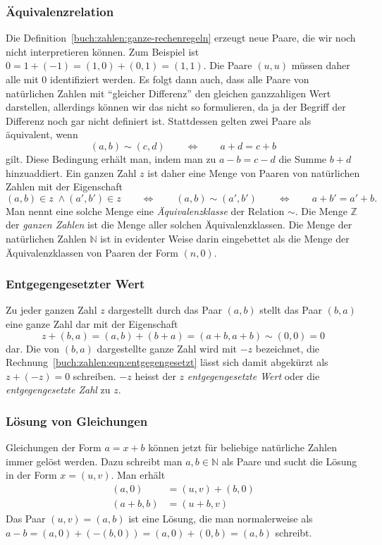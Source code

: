 \subsubsection{Äquivalenzrelation}
Die Definition~\eqref{buch:zahlen:ganze-rechenregeln}
erzeugt neue Paare, die wir noch nicht interpretieren können.
Zum Beispiel ist $0=1+(-1) = (1,0) + (0,1) = (1,1)$.
Die Paare $(u,u)$ müssen daher alle mit $0$ identifiziert werden.
Es folgt dann auch, dass alle Paare von natürlichen Zahlen mit 
``gleicher Differenz'' den gleichen ganzzahligen Wert darstellen,
allerdings können wir das nicht so formulieren, da ja der Begriff
der Differenz noch gar nicht definiert ist.
Stattdessen gelten zwei Paare als äquivalent, wenn
\begin{equation}
(a,b) \sim (c,d)
\qquad\Leftrightarrow\qquad
a+d = c+b
\label{buch:zahlen:ganz-aquivalenz}
\end{equation}
gilt.
Diese Bedingung erhält man, indem man zu $a-b=c-d$ die Summe $b+d$ 
hinzuaddiert.
Ein ganzen Zahl $z$ ist daher eine Menge von Paaren von natürlichen
Zahlen mit der Eigenschaft
\[
(a,b)\in z\;\wedge (a',b')\in z
\qquad\Leftrightarrow\qquad
(a,b)\sim(a',b')
\qquad\Leftrightarrow\qquad
a+b' = a'+b.
\]
Man nennt eine solche Menge eine {\em Äquivalenzklasse} der Relation $\sim$.
Die Menge $\mathbb{Z}$ der {\em ganzen Zahlen} ist die Menge aller solchen
%
Äquivalenzklassen.
Die Menge der natürlichen Zahlen $\mathbb{N}$ ist in evidenter Weise
darin eingebettet als die Menge der Äquivalenzklassen von Paaren der
Form $(n,0)$.

\subsubsection{Entgegengesetzter Wert}
Zu jeder ganzen Zahl $z$ dargestellt durch das Paar $(a,b)$ 
stellt das Paar $(b,a)$ eine ganze Zahl dar mit der Eigenschaft
\begin{equation}
z+(b,a)
=
(a,b) + (b+a) = (a+b,a+b) \sim (0,0) = 0
\label{buch:zahlen:eqn:entgegengesetzt}
\end{equation}
dar.
Die von $(b,a)$ dargestellte ganze Zahl wird mit $-z$ bezeichnet,
die Rechnung~\eqref{buch:zahlen:eqn:entgegengesetzt} lässt sich damit
abgekürzt als $z+(-z)=0$ schreiben.
$-z$ heisst der $z$ {\em entgegengesetzte Wert} oder die
%
{\em entgegengesetzte Zahl} zu $z$.

\subsubsection{Lösung von Gleichungen}
Gleichungen der Form $a=x+b$ können jetzt für beliebige natürliche Zahlen
immer gelöst werden.
Dazu schreibt man $a,b\in\mathbb{N}$ als Paare und sucht die
Lösung in der Form $x=(u,v)$.
Man erhält
\begin{align*}
(a,0) &= (u,v) + (b,0)
\\
(a+b,b) &= (u+b,v)
\end{align*}
Das Paar $(u,v) = (a,b)$ ist eine Lösung, die man normalerweise als
$a-b = (a,0) + (-(b,0)) = (a,0) + (0,b) = (a,b)$ schreibt.

